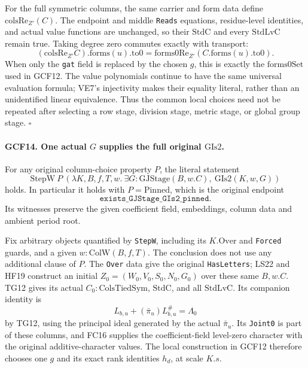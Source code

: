 For the full symmetric columns, the same carrier and form data define
\(\mathrm{colsRe}_{Z'}(C)\).  The endpoint and middle
\texttt{Reads} equations, residue-level identities, and actual value
functions are unchanged, so their \(\mathrm{StdC}\) and every
\(\mathrm{StdLvC}\) remain true.  Taking degree zero commutes
exactly with transport:
\[
  (\mathrm{colsRe}_{Z'}C).\mathrm{forms}(u).\mathrm{to0}
              =\mathrm{forms0Re}_{Z'}(C.\mathrm{forms}(u).\mathrm{to0}).
 \tag{GCF.37}
\]
When only the \texttt{gat} field is replaced by the chosen \(g\),
this is exactly the \(\mathrm{forms0Set}\) used in GCF12.
The value polynomials continue to have the same universal evaluation
formula; VE7's injectivity makes their equality literal, rather than
an unidentified linear equivalence.  Thus the common local choices
need not be repeated after selecting a row stage, division stage,
metric stage, or global group stage.
\hfill\(\square\)

\paragraph{GCF14. One actual \(G\) supplies the full original \(\mathrm{GIs2}\).}
\label{claim:GCF14}
For any original column-choice property \(P\), the literal statement
\[
 \mathrm{StepW}\ P\
  \left(\lambda K,B,f,T,w.\ \exists G:\mathrm{GJStage}(B,w.C),\
                                  \mathrm{GIs2}(K,w,G)\right)
 \tag{GCF.38}
\]
holds.  In particular it holds with \(P=\mathrm{Pinned}\), which
is the original endpoint
\[
 \texttt{exists\_GJStage\_GIs2\_pinned}.
\]
Its witnesses preserve the given coefficient field, embeddings,
column data and ambient period root.

Fix arbitrary objects quantified by \texttt{StepW}, including its
\(K.\mathrm{Over}\) and \texttt{Forced} guards, and a given
\(w:\mathrm{ColW}(B,f,T)\).  The conclusion does not use any
additional clause of \(P\).  The \texttt{Over} data give the
original \texttt{HasLetters}; LS22 and HF19 construct an initial
\(Z_0=(W_0,V_0,S_0,N_0,G_0)\) over these same \(B,w.C\).
TG12 gives its actual \(C_0:\mathrm{ColsTiedSym}\), \(\mathrm{StdC}\),
and all \(\mathrm{StdLvC}\).  Its companion identity is
\[
           L_{b,u}+(\bar\pi_u)L_{b,u}^{\#}=\Lambda_0
\]
by TG12, using the principal ideal generated by the actual
\(\bar\pi_u\).  Its \texttt{Joint0} is part of these columns,
and FC16 supplies the coefficient-field level-zero character with
the original additive-character values.  The local construction in
GCF12 therefore chooses one \(g\) and its exact rank identities
\(h_d\), at scale \(K.s\).

